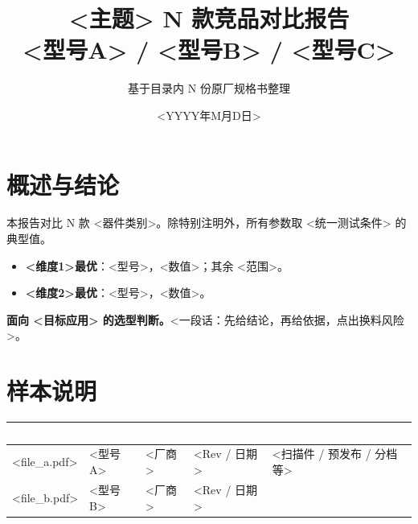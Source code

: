 \documentclass[11pt,a4paper]{ctexart}
\title{\textbf{<主题> N 款竞品对比报告}\\[4pt]
\large <型号A> / <型号B> / <型号C>}
\author{基于目录内 N 份原厂规格书整理}
\date{<YYYY年M月D日>}
\newcommand{\hd}[1]{\textcolor{white}{\textbf{#1}}}
\begin{document}
\maketitle

\section{概述与结论}
本报告对比 N 款 <器件类别>。除特别注明外，所有参数取 <统一测试条件> 的典型值。
\begin{itemize}
  \item \textbf{<维度1>最优}：<型号>，<数值>；其余 <范围>。
  \item \textbf{<维度2>最优}：<型号>，<数值>。
\end{itemize}
\textbf{面向 <目标应用> 的选型判断。}<一段话：先给结论，再给依据，点出换料风险>。

\section{样本说明}
\begin{longtable}{>{\raggedright\arraybackslash}p{3.8cm}>{\raggedright\arraybackslash}p{3.0cm}>{\raggedright\arraybackslash}p{2.4cm}>{\raggedright\arraybackslash}p{2.4cm}>{\raggedright\arraybackslash}p{3.4cm}}
\toprule
\rowcolor{hdr}\hd{文件} & \hd{型号} & \hd{厂商} & \hd{版本 / 日期} & \hd{备注}\\
\midrule
\endhead
<file\_\allowbreak a.pdf> & <型号A> & <厂商> & <Rev / 日期> & <扫描件 / 预发布 / 分档 等>\\
\rowcolor{rowa}<file\_\allowbreak b.pdf> & <型号B> & <厂商> & <Rev / 日期> & \\
\bottomrule
\end{longtable}
\end{document}
